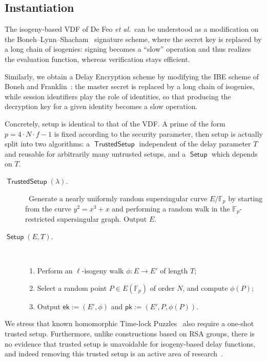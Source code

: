 \documentclass{llncs}
\newcommand{\F}{\mathbb{F}}
\DeclareMathOperator{\Setup}{\mathsf{Setup}}
\DeclareMathOperator{\TSetup}{\mathsf{TrustedSetup}}
\newcommand{\ek}{\mathsf{ek}}
\newcommand{\pk}{\mathsf{pk}}
\begin{document}
\subsection{Instantiation}

The isogeny-based VDF of De Feo \emph{et al.}\ can be understood as a
modification on the Boneh--Lynn--Shacham~\cite{boneh+lynn+shacham04}
signature scheme, where the secret key is replaced by a long chain of
isogenies: signing becomes a ``slow'' operation and thus realizes the
evaluation function, whereas verification stays efficient.

Similarly, we obtain a Delay Encryption scheme by modifying the IBE
scheme of Boneh and Franklin~\cite{doi:10.1137/S0097539701398521}: the
master secret is replaced by a long chain of isogenies, while session
identifiers play the role of identities, so that producing the
decryption key for a given identity becomes a slow operation.

Concretely, setup is identical to that of the VDF. %
A prime of the form $p=4\cdot N\cdot f - 1$ is fixed according to the
security parameter, then setup is actually split into two algorithms:
a $\TSetup$ independent of the delay parameter $T$ and reusable for
arbitrarily many untrusted setups, and a $\Setup$ which depends on
$T$.

\begin{description}
\item[$\TSetup(\lambda)$.]\
  Generate a nearly uniformly random supersingular curve
  $E/\F_p$ by starting from the curve $y^2=x^3+x$ and performing a
  random walk in the $\F_p$-restricted supersingular graph. %
  Output $E$.
\item[$\Setup(E,T)$.]\
  \begin{enumerate}
  \item Perform an $\ell$-isogeny walk $\phi:E\to E'$ of length $T$;
  \item Select a random point $P\in E(\F_p)$ of order $N$, and compute
    $\phi(P)$;
  \item Output $\ek:=(E',\phi)$ and $\pk:=(E',P,\phi(P))$.
  \end{enumerate}
\end{description}

We stress that known homomorphic Time-lock Puzzles~\cite{C:MalThy19}
also require a one-shot trusted setup. %
Furthermore, unlike constructions based on RSA groups,
there is no evidence that trusted setup is unavoidable for
isogeny-based delay functions, and indeed removing this trusted setup
is an active area of
research~\cite{10.1007/978-3-030-45724-2_18,love2020supersingular}.
\end{document}
